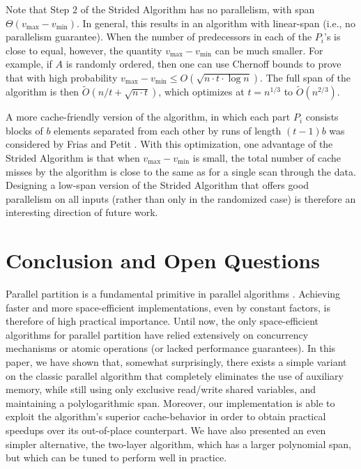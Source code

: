 \documentclass[sigconf]{acmart}
\theoremstyle{remark}
\theoremstyle{remark}
\begin{document}
Note that Step 2 of the Strided Algorithm has no parallelism, with
span $\Theta(v_{\text{max}} - v_{\text{min}})$. In general, this
results in an algorithm with linear-span (i.e., no parallelism
guarantee). When the number of predecessors in each of the $P_i$'s is
close to equal, however, the quantity $v_{\text{max}} -
v_{\text{min}}$ can be much smaller. For example, if $A$ is randomly
ordered, then one can use Chernoff bounds to prove that with high
probability $v_{\text{max}} - v_{\text{min}} \le O(\sqrt{n \cdot t
  \cdot \log n})$. The full span of the algorithm is then
$\tilde{O}(n/t + \sqrt{n \cdot t})$, which optimizes at $t = n^{1/3}$
to $\tilde{O}(n^{2/3})$.

A more cache-friendly version of the algorithm, in which each part
$P_i$ consists blocks of $b$ elements separated from each other by
runs of length $(t - 1) b$ was considered by Frias and Petit
\cite{Frias08}. With this optimization, one advantage of the Strided
Algorithm is that when $v_{\text{max}} - v_{\text{min}}$ is small, the
total number of cache misses by the algorithm is close to the same as
for a single scan through the data. Designing a low-span version of
the Strided Algorithm that offers good parallelism on all inputs
(rather than only in the randomized case) is therefore an interesting
direction of future work.



\section{Conclusion and Open Questions}

Parallel partition is a fundamental primitive in parallel algorithms
\cite{Blelloch96,AcarBl16}. Achieving faster and more space-efficient
implementations, even by constant factors, is therefore of high
practical importance. Until now, the only space-efficient algorithms
for parallel partition have relied extensively on concurrency
mechanisms or atomic operations (or lacked performance guarantees). In
this paper, we have shown that, somewhat surprisingly, there exists a
simple variant on the classic parallel algorithm that completely
eliminates the use of auxiliary memory, while still using only
exclusive read/write shared variables, and maintaining a
polylogarithmic span. Moreover, our implementation is able to exploit
the algorithm's superior cache-behavior in order to obtain practical
speedups over its out-of-place counterpart. We have also presented an
even simpler alternative, the two-layer algorithm, which has a larger
polynomial span, but which can be tuned to perform well in practice.
\end{document}
